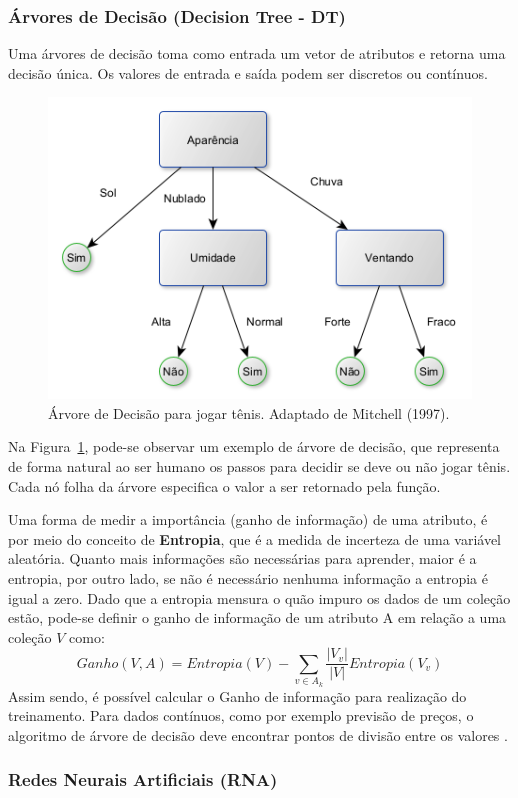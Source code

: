 \documentclass[12pt]{article}
\begin{document}
\subsubsection{Árvores de Decisão (Decision Tree - DT)}

Uma árvores de decisão toma como entrada um vetor de atributos e retorna uma decisão única. Os valores de entrada e saída podem ser discretos ou contínuos.

\begin{figure}[h]
  \centering
  \includegraphics[width=.4\textwidth]{img/fig_arvore_decisao.png}
  \caption{Árvore de Decisão para jogar tênis. Adaptado de Mitchell (1997).}
  \label{fig_arvore_decisao}
\end{figure}

Na Figura~\ref{fig_arvore_decisao}, pode-se observar um exemplo de árvore de decisão, que representa de forma natural ao ser humano os passos para decidir se deve ou não jogar tênis. Cada nó folha da árvore especifica o valor a ser retornado pela função.

Uma forma de medir a importância (ganho de informação) de uma atributo, é por meio do conceito de \textbf{Entropia}, que é a medida de incerteza de uma variável aleatória. Quanto mais informações são necessárias para aprender, maior é a entropia, por outro lado, se não é necessário nenhuma informação a entropia é igual a zero. Dado que a entropia mensura o quão impuro os dados de um coleção estão, pode-se definir o ganho de informação de um atributo A em relação a uma coleção $V$ como:
\begin{equation}
  Ganho(V, A) = Entropia(V) - \sum_{v\in A_k}\frac{|V_v|}{|V|} Entropia(V_v)
\end{equation}
Assim sendo, é possível calcular o Ganho de informação para realização do treinamento. Para dados contínuos, como por exemplo previsão de preços, o algoritmo de árvore de decisão deve encontrar pontos de divisão entre os valores \cite{mitchell:1997,stuartnorvig:2013}.

\subsubsection{Redes Neurais Artificiais (RNA)}
\end{document}
